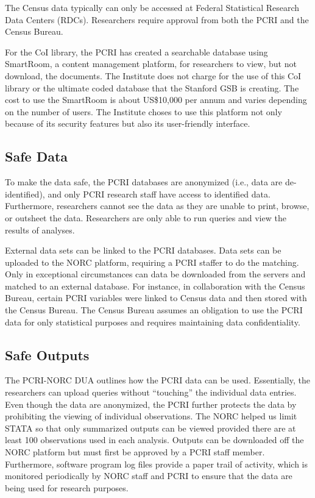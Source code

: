 The Census data typically can only be accessed at Federal Statistical Research Data Centers (RDCs). Researchers require approval from both the PCRI and the Census Bureau.

For the CoI library, the PCRI has created a searchable database using SmartRoom, a content management platform, for researchers to view, but not download, the documents. The Institute does not charge for the use of this CoI library or the ultimate coded database that the Stanford GSB is creating. The cost to use the SmartRoom is about US\$10,000 per annum and varies depending on the number of users. The Institute choses to use this platform not only because of its security features but also its user-friendly interface.

\hypertarget{safe-data-2}{%
\subsection{Safe Data}\label{safe-data-2}}

To make the data safe, the PCRI databases are anonymized (i.e., data are de-identified), and only PCRI research staff have access to identified data. Furthermore, researchers cannot see the data as they are unable to print, browse, or outsheet the data. Researchers are only able to run queries and view the results of analyses.

External data sets can be linked to the PCRI databases. Data sets can be uploaded to the NORC platform, requiring a PCRI staffer to do the matching. Only in exceptional circumstances can data be downloaded from the servers and matched to an external database. For instance, in collaboration with the Census Bureau, certain PCRI variables were linked to Census data and then stored with the Census Bureau. The Census Bureau assumes an obligation to use the PCRI data for only statistical purposes and requires maintaining data confidentiality.

\hypertarget{safe-outputs-2}{%
\subsection{Safe Outputs}\label{safe-outputs-2}}

The PCRI-NORC DUA outlines how the PCRI data can be used. Essentially, the researchers can upload queries without ``touching'' the individual data entries. Even though the data are anonymized, the PCRI further protects the data by prohibiting the viewing of individual observations. The NORC helped us limit STATA so that only summarized outputs can be viewed provided there are at least 100 observations used in each analysis. Outputs can be downloaded off the NORC platform but must first be approved by a PCRI staff member. Furthermore, software program log files provide a paper trail of activity, which is monitored periodically by NORC staff and PCRI to ensure that the data are being used for research purposes.

